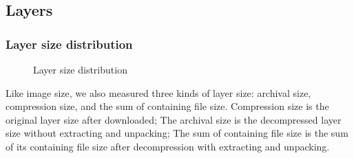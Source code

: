 \subsection{Layers}
\label{sec:layers}

\subsubsection{Layer size distribution}

\begin{figure}[!t]
	\centering
	\caption{Layer size distribution}
	\label{fig-layer-size}
\end{figure}

Like image size, we also measured three kinds of layer size: archival size, compression size, and the sum of containing file size. Compression size is the original layer size after downloaded; The archival size is the decompressed layer size without extracting and unpacking; The sum of containing file size is the sum of its containing file size after decompression with extracting and unpacking.

